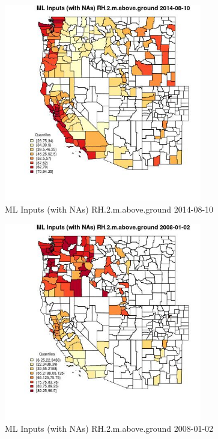 \begin{figure} 
\centering  
\includegraphics[width=0.77\textwidth]{Code_Outputs/Report_ML_input_PM25_Step4_part_e_de_duplicated_aves_compiled_2019-05-18wNAs_CountyRH2mabovegroundMean2014-08-10_2014-08-10.jpg} 
\caption{\label{fig:Report_ML_input_PM25_Step4_part_e_de_duplicated_aves_compiled_2019-05-18wNAsCountyRH2mabovegroundMean2014-08-10_2014-08-10}ML Inputs (with NAs) RH.2.m.above.ground 2014-08-10} 
\end{figure} 
 

\begin{figure} 
\centering  
\includegraphics[width=0.77\textwidth]{Code_Outputs/Report_ML_input_PM25_Step4_part_e_de_duplicated_aves_compiled_2019-05-18wNAs_CountyRH2mabovegroundMean2008-01-02_2008-01-02.jpg} 
\caption{\label{fig:Report_ML_input_PM25_Step4_part_e_de_duplicated_aves_compiled_2019-05-18wNAsCountyRH2mabovegroundMean2008-01-02_2008-01-02}ML Inputs (with NAs) RH.2.m.above.ground 2008-01-02} 
\end{figure} 
 

